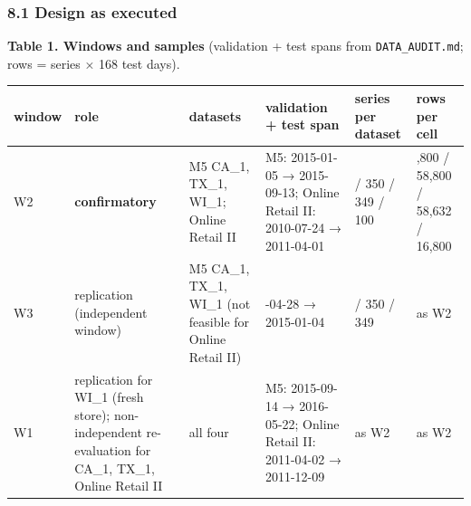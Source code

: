 \documentclass[
]{article}
\newcounter{none} %
\begin{document}
\subsubsection{8.1 Design as executed}\label{design-as-executed}

\textbf{Table 1. Windows and samples} (validation + test spans from
\texttt{DATA\_AUDIT.md}; rows = series × 168 test days).

{\def\LTcaptype{none} %
\begin{longtable}[]{@{}
  >{\raggedright\arraybackslash}p{}
  >{\raggedright\arraybackslash}p{}
  >{\raggedright\arraybackslash}p{}
  >{\raggedright\arraybackslash}p{}
  >{\raggedright\arraybackslash}p{}
  >{\raggedright\arraybackslash}p{}@{}}
\toprule\noalign{}
\begin{minipage}[b]{\linewidth}\raggedright
window
\end{minipage} & \begin{minipage}[b]{\linewidth}\raggedright
role
\end{minipage} & \begin{minipage}[b]{\linewidth}\raggedright
datasets
\end{minipage} & \begin{minipage}[b]{\linewidth}\raggedright
validation + test span
\end{minipage} & \begin{minipage}[b]{\linewidth}\raggedright
series per dataset
\end{minipage} & \begin{minipage}[b]{\linewidth}\raggedright
rows per cell
\end{minipage} \\
\midrule\noalign{}
\endhead
\bottomrule\noalign{}
\endlastfoot
W2 & \textbf{confirmatory} & M5 CA\_1, TX\_1, WI\_1; Online Retail II &
M5: 2015-01-05 → 2015-09-13; Online Retail II: 2010-07-24 → 2011-04-01 &
350 / 350 / 349 / 100 & 58,800 / 58,800 / 58,632 / 16,800 \\
W3 & replication (independent window) & M5 CA\_1, TX\_1, WI\_1 (not
feasible for Online Retail II) & 2014-04-28 → 2015-01-04 & 350 / 350 /
349 & as W2 \\
W1 & replication for WI\_1 (fresh store); non-independent re-evaluation
for CA\_1, TX\_1, Online Retail II & all four & M5: 2015-09-14 →
2016-05-22; Online Retail II: 2011-04-02 → 2011-12-09 & as W2 & as W2 \\
\end{longtable}
}
\end{document}

